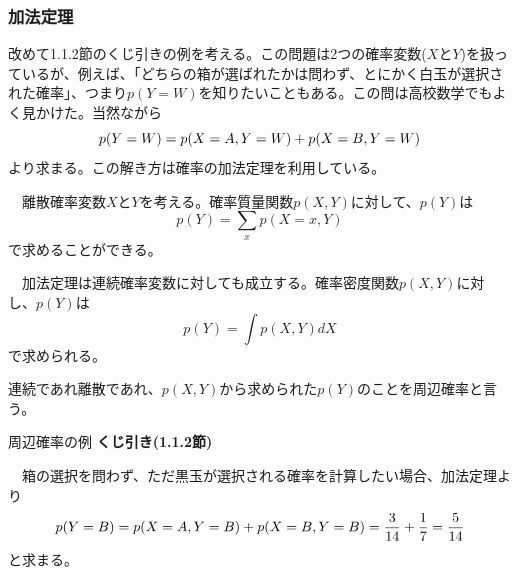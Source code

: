 \documentclass[dvipdfmx, 9pt, a4paper]{jsarticle}
\begin{document}
\subsubsection{加法定理}
改めて1.1.2節のくじ引きの例を考える。この問題は2つの確率変数($X$と$Y$)を扱っているが、例えば、「どちらの箱が選ばれたかは問わず、とにかく白玉が選択された確率」、つまり$p(Y=W)$を知りたいこともある。この問は高校数学でもよく見かけた。当然ながら
\begin{equation}
p(Y=W)=p(X=A, Y=W)+p(X=B, Y=W) \notag
\end{equation}
より求まる。この解き方は確率の加法定理を利用している。
\begin{tcolorbox}[title=加法定理]
　離散確率変数$X$と$Y$を考える。確率質量関数$p(X, Y)$に対して、$p(Y)$は
\begin{equation}
p(Y)=\sum_x p(X=x, Y)
\end{equation}
で求めることができる。\par
　加法定理は連続確率変数に対しても成立する。確率密度関数$p(X, Y)$に対し、$p(Y)$は
\begin{equation}
p(Y)=\int p(X, Y)dX
\end{equation}
で求められる。\par
連続であれ離散であれ、$p(X, Y)$から求められた$p(Y)$のことを周辺確率と言う。
\end{tcolorbox}
\begin{itembox}[l]{周辺確率の例}
{\bf くじ引き(1.1.2節)}\par
　箱の選択を問わず、ただ黒玉が選択される確率を計算したい場合、加法定理より
\begin{equation}
p(Y=B)=p(X=A, Y=B)+p(X=B, Y=B)=\frac{3}{14}+\frac{1}{7}=\frac{5}{14} \notag
\end{equation}
と求まる。
\end{itembox}
\end{document}

